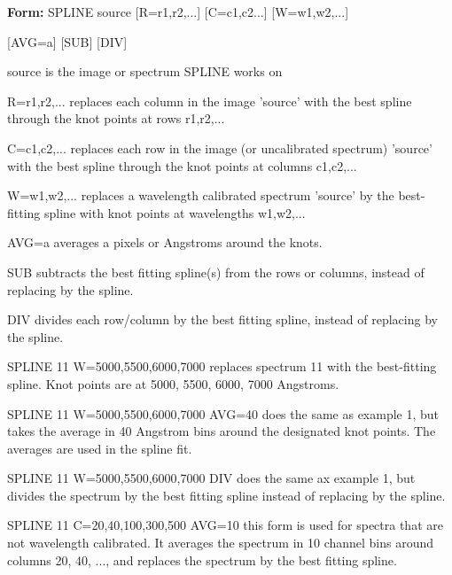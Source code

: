 {\newpage\clearpage
{}%
\begin{command}
  \item[\textbf{Form: } SPLINE source {[R=r1,r2,...]} {[C=c1,c2...]} 
       {[W=w1,w2,...]}\hfill]{}
  \item{{[AVG=a]} {[SUB]} {[DIV]}}
  \item[source]{is the image or spectrum SPLINE works on}
  \item[R=r1,r2,...]{replaces each column in the image 'source'
       with the best spline through the knot points at rows r1,r2,...}
  \item[C=c1,c2,...]{replaces each row in the image (or uncalibrated 
       spectrum) 'source' with the best spline 
       through the knot points at columns c1,c2,...}
  \item[W=w1,w2,...]{replaces a wavelength calibrated spectrum
       'source' by the best-fitting spline with knot
       points at wavelengths w1,w2,...}
  \item[AVG=a]{averages a pixels or Angstroms around the knots.}
  \item[SUB]{subtracts the best fitting spline(s) from the 
       rows or columns, instead of replacing by the spline.}
  \item[DIV]{divides each row/column by the best fitting
       spline, instead of replacing by the spline.}
\end{command}%
\lthtmlfigureZ
\lthtmlcheckvsize\clearpage}

{\newpage\clearpage
{}%
\begin{example}
  \item[SPLINE 11 W=5000,5500,6000,7000\hfill]{ replaces spectrum 11 with
       the best-fitting spline.  Knot points are at 5000, 5500, 6000, 7000
       Angstroms.}
\par
\item[SPLINE 11 W=5000,5500,6000,7000 AVG=40\hfill]{ does the same as
       example 1, but takes the average in 40 Angstrom bins around the
       designated knot points.  The averages are used in the spline fit.}
\par
\item[SPLINE 11 W=5000,5500,6000,7000 DIV\hfill]{ does the same ax
       example 1, but divides the spectrum by the best fitting spline
       instead of replacing by the spline.}
\par
\item[SPLINE 11 C=20,40,100,300,500 AVG=10\hfill]{ this form is used for
       spectra that are not wavelength calibrated.  It averages the
       spectrum in 10 channel bins around columns 20, 40, ..., and replaces
       the spectrum by the best fitting spline.}
\end{example}%
\lthtmlfigureZ
\lthtmlcheckvsize\clearpage}

